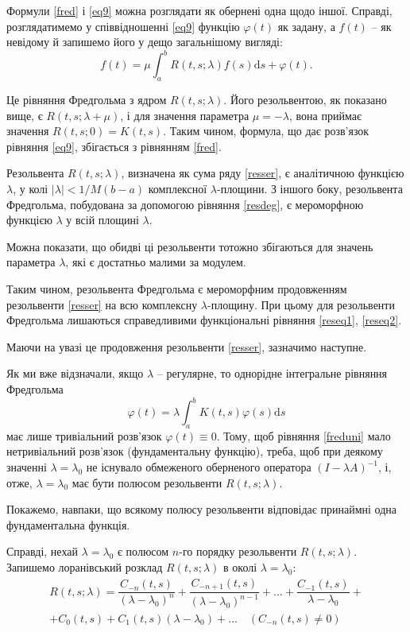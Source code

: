 \documentclass[14pt,twoside]{extreport}
\theoremstyle{mystyle}
\numberwithin{equation}{chapter}
\begin{document}
Формули \eqref{fred} і \eqref{eq9} можна розглядати як обернені одна щодо іншої. Справді, розглядатимемо у співвідношенні \eqref{eq9} функцію $\varphi(t)$ як задану, а $f(t)$ -- як невідому й запишемо його у дещо загальнішому вигляді:
\begin{equation}
 f(t) = \mu \int_{a}^{b}R(t,s; \lambda) f(s) \mathrm{d}s + \varphi(t).
\end{equation}

Це рівняння Фредгольма з ядром $R(t, s; \lambda)$. Його резольвентою, як показано вище, є $R(t, s; \lambda + \mu)$, і для значення параметра $\mu = -\lambda$, вона приймає значення $R(t,s; 0) = K(t, s)$. Таким чином, формула, що дає розв'язок рівняння \eqref{eq9}, збігається з рівнянням \eqref{fred}.

Резольвента $R(t, s; \lambda)$, визначена як сума ряду \eqref{resser}, є аналітичною функцією $\lambda$, у колі $|\lambda| < 1/M(b-a)$ комплексної $\lambda$-площини. З іншого боку, резольвента Фредгольма, побудована за допомогою рівняння \eqref{resdeg}, є мероморфною функцією $\lambda$ у всій площині $\lambda$.

Можна показати, що обидві ці резольвенти тотожно збігаються для значень параметра $\lambda$, які є достатньо малими за модулем.

Таким чином, резольвента Фредгольма є мероморфним продовженням резольвенти \eqref{resser} на всю комплексну $\lambda$-площину. При цьому для резольвенти Фредгольма лишаються справедливими функціональні рівняння \eqref{reseq1}, \eqref{reseq2}.

Маючи на увазі це продовження резольвенти \eqref{resser}, зазначимо наступне.

Як ми вже відзначали, якщо $\lambda$ -- регулярне, то однорідне інтегральне рівняння Фредгольма
\begin{equation}\label{freduni}
 \varphi(t) = \lambda \int_{a}^{b} K(t,s) \varphi(s) \mathrm{d}s
\end{equation}
має лише тривіальний розв'язок $\varphi(t) \equiv 0$. Тому, щоб рівняння \eqref{freduni} мало нетривіальний розв'язок (фундаментальну функцію), треба, щоб при деякому значенні $\lambda = \lambda_0$ не існувало обмеженого оберненого оператора $(I - \lambda A)^{-1}$, і, отже, $\lambda = \lambda_0$ має бути полюсом резольвенти $R(t, s; \lambda)$.

Покажемо, навпаки, що всякому полюсу резольвенти відповідає принаймні одна фундаментальна функція.

Справді, нехай $\lambda = \lambda_0$ є полюсом $n$-го порядку резольвенти $R(t, s; \lambda)$. Запишемо лоранівський розклад $R(t, s; \lambda)$ в околі $\lambda = \lambda_0$:
\begin{multline}\label{laurentres}
  R(t, s; \lambda) = \dfrac{C_{-n}(t, s) }{(\lambda - \lambda_0)^n} + \dfrac{C_{-n+1}(t, s) }{(\lambda - \lambda_0)^{n-1}} + \ldots + \dfrac{C_{-1}(t, s) }{\lambda - \lambda_0}  +\\
  + C_0(t, s) + C_1(t, s) (\lambda - \lambda_0) + \ldots \quad (C_{-n} (t, s) \neq 0)
\end{multline}
\end{document}
